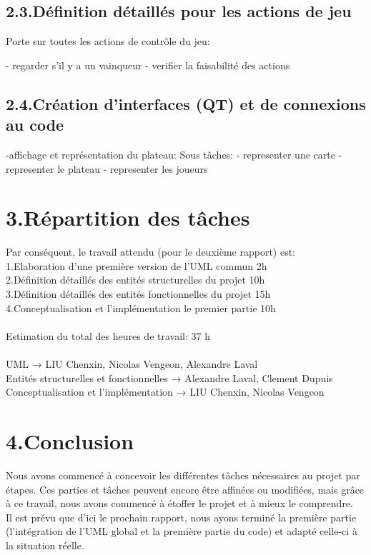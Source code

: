 \documentclass[a4paper]{article}
\begin{document}
\subsection*{2.3.Définition détaillés pour les actions de jeu}

Porte sur toutes les actions de contrôle du jeu:

- regarder s’il y a un vainqueur
- verifier la faisabilité des actions

\subsection*{2.4.Création d'interfaces (QT) et de connexions au code}
-affichage et représentation  du plateau:
 Sous tâches:
 - representer une carte
 - representer le plateau
 - representer les joueurs



\section*{3.Répartition des tâches}
Par conséquent, le travail attendu (pour le deuxième rapport) est:\\
1.Elaboration d'une première version de l'UML commun 2h\\
2.Définition détaillés des entités structurelles du projet 10h\\
3.Définition détaillés des entités fonctionnelles du projet 15h\\
4.Conceptualisation et l’implémentation le premier partie 10h\\
\\
Estimation du total des heures de travail: 37 h\\
\\
UML → LIU Chenxin, Nicolas Vengeon, Alexandre Laval\\
Entités structurelles et fonctionnelles → Alexandre Laval, 	Clement Dupuis\\
Conceptualisation et l’implémentation → LIU Chenxin, Nicolas Vengeon\\

\section*{4.Conclusion}
Nous avons commencé à concevoir les différentes tâches nécessaires au projet par étapes. Ces parties et tâches peuvent encore être affinées ou modifiées, mais grâce à ce travail, nous avons commencé à étoffer le projet et à mieux le comprendre.\\
 Il est prévu que d'ici le prochain rapport, nous ayons terminé la première partie (l'intégration de l'UML global et la première partie du code) et adapté celle-ci à la situation réelle.





\end{document}
